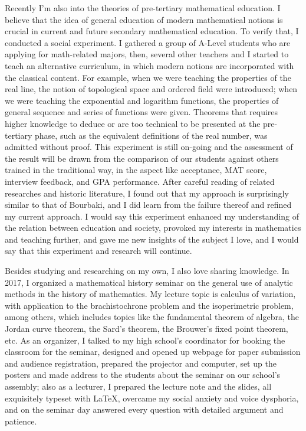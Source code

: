 \documentclass[10pt]{article}
\begin{document}
\begin{CJK*}{UTF8}{gbsn}
Recently I'm also into the theories of pre-tertiary mathematical education. I believe that the idea of general education of modern mathematical notions is crucial in current and future secondary mathematical education. To verify that, I conducted a social experiment. I gathered a group of A-Level students who are applying for math-related majors, then, several other teachers and I started to teach an alternative curriculum, in which modern notions are incorporated with the classical content. For example, when we were teaching the properties of the real line, the notion of topological space and ordered field were introduced; when we were teaching the exponential and logarithm functions, the properties of general sequence and series of functions were given. Theorems that requires higher knowledge to deduce or are too technical to be presented at the pre-tertiary phase, such as the equivalent definitions of the real number, was admitted without proof. This experiment is still on-going and the assessment of the result will be drawn from the comparison of our students against others trained in the traditional way, in the aspect like acceptance, MAT score, interview feedback, and GPA performance. After careful reading of related researches and historic literature, I found out that my approach is surprisingly similar to that of Bourbaki, and I did learn from the failure thereof and refined my current approach. I would say this experiment enhanced my understanding of the relation between education and society, provoked my interests in mathematics and teaching further, and gave me new insights of the subject I love, and I would say that this experiment and research will continue.

Besides studying and researching on my own, I also love sharing knowledge. In 2017, I organized a mathematical history seminar on the general use of analytic methods in the history of mathematics. My lecture topic is calculus of variation, with application to the brachistochrone problem and the isoperimetric problem, among others, which includes topics like the fundamental theorem of algebra, the Jordan curve theorem, the Sard's theorem, the Brouwer's fixed point theorem, etc. As an organizer, I talked to my high school's coordinator for booking the classroom for the seminar, designed and opened up webpage for paper submission and audience registration, prepared the projector and computer, set up the posters and made address to the students about the seminar on our school's assembly; also as a lecturer, I prepared the lecture note and the slides, all exquisitely typeset with {\LaTeX}, overcame my social anxiety and voice dysphoria, and on the seminar day answered every question with detailed argument and patience.


\end{CJK*}
\end{document}
